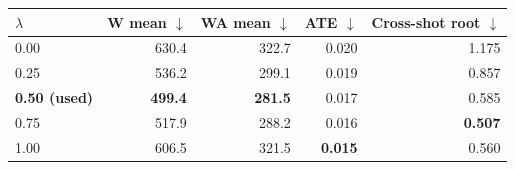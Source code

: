 \begin{tabular}{lrrrr}
\toprule
$\lambda$ & W mean $\downarrow$ & WA mean $\downarrow$ & ATE $\downarrow$ & Cross-shot root $\downarrow$ \\
\midrule
0.00 & 630.4 & 322.7 & 0.020 & 1.175 \\
0.25 & 536.2 & 299.1 & 0.019 & 0.857 \\
\textbf{0.50 (used)} & \textbf{499.4} & \textbf{281.5} & 0.017 & 0.585 \\
0.75 & 517.9 & 288.2 & 0.016 & \textbf{0.507} \\
1.00 & 606.5 & 321.5 & \textbf{0.015} & 0.560 \\
\bottomrule
\end{tabular}
